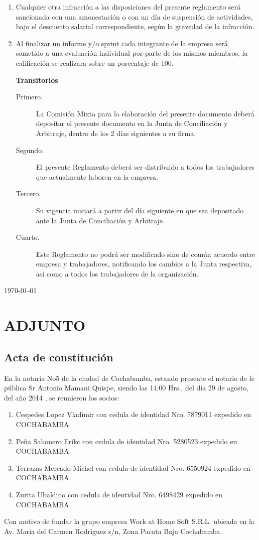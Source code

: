 \documentclass[11pt,letterpaper]{report}
\begin{document}
\begin{enumerate}
\item Cualquier otra infracción a las disposiciones del presente reglamento será sancionada con una amonestación o con un día de suspensión de actividades, bajo el descuento salarial correspondiente, según la gravedad de la infracción.
\item Al finalizar un informe y/o sprint cada integrante de la empresa será sometido a una evaluación individual por parte de los mismos miembros, la calificación se realizara sobre un porcentaje de 100.
\begin{center}
{\bf Transitorios}
\end{center}
\begin{description}
\item[Primero.] La Comisión Mixta para la elaboración del presente documento deberá depositar el presente documento en la Junta de Conciliación y Arbitraje, dentro de los 2 días siguientes a su firma.
\item[Segundo.] El presente Reglamento deberá ser distribuido a todos los trabajadores que actualmente laboren en la empresa.
\item[Tercero.] Su vigencia iniciará a partir del día siguiente en que sea depositado ante la Junta de Conciliación y Arbitraje.
\item[Cuarto.] Este Reglamento no podrá ser modificado sino de común acuerdo entre empresa y trabajadores, notificando los cambios a la Junta respectiva, así como a todos los trabajadores de la organización.
\end{description}
\end{enumerate}
\begin{flushright}
\today
\end{flushright}

\chapter{ADJUNTO}
\section{Acta de constituci\'on}
En la notaria No5 de la ciudad de Cochabamba, estando presente el notario de fe p\'ublica Sr Antonio Mamani Quispe, siendo las 14:00 Hrs., del d\'ia 29 de agosto, del a\~no 2014 , se reunieron los socios:\\
\begin{enumerate}
\item Cespedes Lopez Vladimir con cedula de identidad Nro. 7879011 expedido en
COCHABAMBA
\item Pe\~na Sahonero Erikc con cedula de identidad Nro. 5280523 expedido en
COCHABAMBA
\item Terrazas Mercado Michel con cedula de identidad Nro. 6550924 expedido en
COCHABAMBA
\item Zurita Ubaldino con cedula de identidad Nro. 6498429 expedido en
COCHABAMBA
\end{enumerate}
Con motivo de fundar la grupo empresa Work at Home Soft S.R.L. ubicada en la Av. Maria del Carmen Rodriguez s/n, Zona Pacata Baja Cochabamba.
\end{document}
